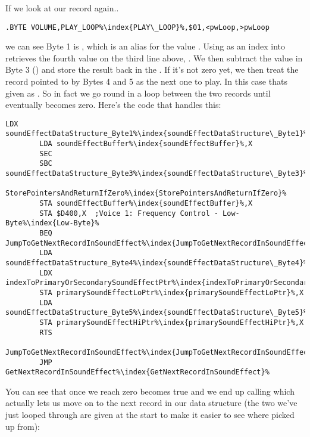 If we look at our record again..

\begin{lstlisting}[escapechar=\%]
              .BYTE VOLUME,PLAY_LOOP%\index{PLAY\_LOOP}%,$01,<pwLoop,>pwLoop
\end{lstlisting}

we can see Byte 1 is , which is an alias for the value . Using  as an index into
 retrieves the fourth value on the third line above, . We then subtract the value
in Byte 3 () and store the result back in the . If it's not zero yet,
we then treat the record pointed to by Bytes 4 and 5 as the next one to play. In this case thats given as . So in
fact we go round in a loop between the two records until  eventually becomes zero. Here's the code that handles this:


\begin{lstlisting}[escapechar=\%]
        LDX soundEffectDataStructure_Byte1%\index{soundEffectDataStructure\_Byte1}%
        LDA soundEffectBuffer%\index{soundEffectBuffer}%,X
        SEC
        SBC soundEffectDataStructure_Byte3%\index{soundEffectDataStructure\_Byte3}%

StorePointersAndReturnIfZero%\index{StorePointersAndReturnIfZero}%
        STA soundEffectBuffer%\index{soundEffectBuffer}%,X
        STA $D400,X  ;Voice 1: Frequency Control - Low-Byte%\index{Low-Byte}%
        BEQ JumpToGetNextRecordInSoundEffect%\index{JumpToGetNextRecordInSoundEffect}%
        LDA soundEffectDataStructure_Byte4%\index{soundEffectDataStructure\_Byte4}%
        LDX indexToPrimaryOrSecondarySoundEffectPtr%\index{indexToPrimaryOrSecondarySoundEffectPtr}%
        STA primarySoundEffectLoPtr%\index{primarySoundEffectLoPtr}%,X
        LDA soundEffectDataStructure_Byte5%\index{soundEffectDataStructure\_Byte5}%%\index{soundEffectDataStructure\_Byte5}%
        STA primarySoundEffectHiPtr%\index{primarySoundEffectHiPtr}%,X
        RTS

JumpToGetNextRecordInSoundEffect%\index{JumpToGetNextRecordInSoundEffect}%   
        JMP GetNextRecordInSoundEffect%\index{GetNextRecordInSoundEffect}%
\end{lstlisting}

You can see that once we reach zero  becomes true and we end up calling 
 which actually lets us move on to the next record in our data structure (the two
we've just looped through are given at the start to make it easier to see where picked up from):


